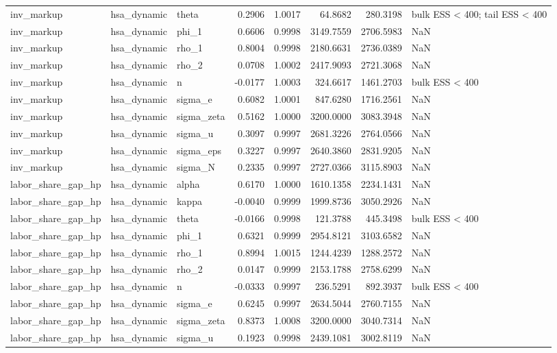 \begin{tabular}{lllrrrrl}
inv\_markup & hsa\_dynamic & theta & 0.2906 & 1.0017 & 64.8682 & 280.3198 & bulk ESS < 400; tail ESS < 400 \\
inv\_markup & hsa\_dynamic & phi\_1 & 0.6606 & 0.9998 & 3149.7559 & 2706.5983 & NaN \\
inv\_markup & hsa\_dynamic & rho\_1 & 0.8004 & 0.9998 & 2180.6631 & 2736.0389 & NaN \\
inv\_markup & hsa\_dynamic & rho\_2 & 0.0708 & 1.0002 & 2417.9093 & 2721.3068 & NaN \\
inv\_markup & hsa\_dynamic & n & -0.0177 & 1.0003 & 324.6617 & 1461.2703 & bulk ESS < 400 \\
inv\_markup & hsa\_dynamic & sigma\_e & 0.6082 & 1.0001 & 847.6280 & 1716.2561 & NaN \\
inv\_markup & hsa\_dynamic & sigma\_zeta & 0.5162 & 1.0000 & 3200.0000 & 3083.3948 & NaN \\
inv\_markup & hsa\_dynamic & sigma\_u & 0.3097 & 0.9997 & 2681.3226 & 2764.0566 & NaN \\
inv\_markup & hsa\_dynamic & sigma\_eps & 0.3227 & 0.9997 & 2640.3860 & 2831.9205 & NaN \\
inv\_markup & hsa\_dynamic & sigma\_N & 0.2335 & 0.9997 & 2727.0366 & 3115.8903 & NaN \\
labor\_share\_gap\_hp & hsa\_dynamic & alpha & 0.6170 & 1.0000 & 1610.1358 & 2234.1431 & NaN \\
labor\_share\_gap\_hp & hsa\_dynamic & kappa & -0.0040 & 0.9999 & 1999.8736 & 3050.2926 & NaN \\
labor\_share\_gap\_hp & hsa\_dynamic & theta & -0.0166 & 0.9998 & 121.3788 & 445.3498 & bulk ESS < 400 \\
labor\_share\_gap\_hp & hsa\_dynamic & phi\_1 & 0.6321 & 0.9999 & 2954.8121 & 3103.6582 & NaN \\
labor\_share\_gap\_hp & hsa\_dynamic & rho\_1 & 0.8994 & 1.0015 & 1244.4239 & 1288.2572 & NaN \\
labor\_share\_gap\_hp & hsa\_dynamic & rho\_2 & 0.0147 & 0.9999 & 2153.1788 & 2758.6299 & NaN \\
labor\_share\_gap\_hp & hsa\_dynamic & n & -0.0333 & 0.9997 & 236.5291 & 892.3937 & bulk ESS < 400 \\
labor\_share\_gap\_hp & hsa\_dynamic & sigma\_e & 0.6245 & 0.9997 & 2634.5044 & 2760.7155 & NaN \\
labor\_share\_gap\_hp & hsa\_dynamic & sigma\_zeta & 0.8373 & 1.0008 & 3200.0000 & 3040.7314 & NaN \\
labor\_share\_gap\_hp & hsa\_dynamic & sigma\_u & 0.1923 & 0.9998 & 2439.1081 & 3002.8119 & NaN \\

\end{tabular}
